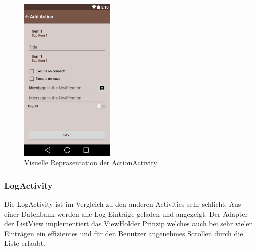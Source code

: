 \begin{figure}[ht]
	\centering
	\includegraphics[width=0.4\textwidth]{images/actionactivity.png}
	\caption{Visuelle Repräsentation der ActionActivity}
	\label{fig:actionctivity}
\end{figure}

\subsubsection{LogActivity}
Die LogActivity ist im Vergleich zu den anderen Activities sehr schlicht. Aus einer Datenbank werden alle Log Einträge geladen und angezeigt. Der Adapter der ListView implementiert das ViewHolder Prinzip welches auch bei sehr vielen Einträgen ein effizientes und für den Benutzer angenehmes Scrollen durch die Liste erlaubt.


\newpage{}
